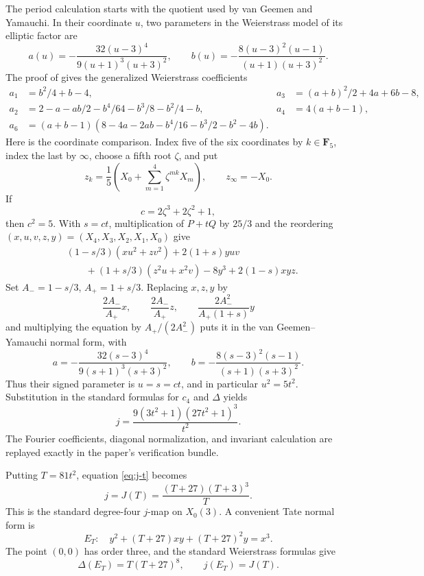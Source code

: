 \documentclass[11pt]{article}
\numberwithin{equation}{section}
\theoremstyle{definition}
\theoremstyle{remark}
\newcommand{\F}{\mathbf F}
\begin{document}
The period calculation starts with the quotient used by van Geemen and
Yamauchi.  In their coordinate \(u\), two parameters in the
Weierstrass model of its elliptic factor are
\[
 a(u)=-\frac{32(u-3)^4}{9(u+1)^3(u+3)^2},\qquad
 b(u)=-\frac{8(u-3)^2(u-1)}{(u+1)(u+3)^2}.
\]
The proof of \cite[Proposition~3.1]{VGY} gives the generalized Weierstrass
coefficients
\begin{align*}
 a_1&=b^2/4+b-4,&
 a_3&=(a+b)^2/2+4a+6b-8,\\
 a_2&=2-a-ab/2-b^4/64-b^3/8-b^2/4-b,&
 a_4&=4(a+b-1),\\
 a_6&=(a+b-1)(8-4a-2ab-b^4/16-b^3/2-b^2-4b).
\end{align*}
Here is the coordinate comparison.  Index five of the six coordinates by
\(k\in\F_5\), index the last by \(\infty\), choose a fifth root \(\zeta\), and
put
\[
 z_k=\frac{1}{5}\left(X_0+\sum_{m=1}^4\zeta^{mk}X_m\right),
 \qquad z_\infty=-X_0.
\]
If
\[
 c=2\zeta^3+2\zeta^2+1,
\]
then \(c^2=5\).  With \(s=ct\), multiplication of \(P+tQ\) by \(25/3\)
and the reordering
\((x,u,v,z,y)=(X_4,X_3,X_2,X_1,X_0)\) give
\begin{align*}
 &(1-s/3)(xu^2+zv^2)+2(1+s)yuv\\
 &\qquad +(1+s/3)(z^2u+x^2v)-8y^3+2(1-s)xyz.
\end{align*}
Set \(A_-=1-s/3\), \(A_+=1+s/3\).  Replacing \(x,z,y\) by
\[
 \frac{2A_-}{A_+}x,\qquad
 \frac{2A_-}{A_+}z,\qquad
 \frac{2A_-^2}{A_+(1+s)}y
\]
and multiplying the equation by \(A_+/(2A_-^2)\) puts it in the van
Geemen--Yamauchi normal form, with
\[
 a=-\frac{32(s-3)^4}{9(s+1)^3(s+3)^2},\qquad
 b=-\frac{8(s-3)^2(s-1)}{(s+1)(s+3)^2}.
\]
Thus their signed parameter is \(u=s=ct\), and in particular
\(u^2=5t^2\).  Substitution in the standard formulas for \(c_4\) and
\(\Delta\) yields
\begin{equation}\label{eq:j-t}
 j=\frac{9(3t^2+1)(27t^2+1)^3}{t^2}.
\end{equation}
The Fourier coefficients, diagonal normalization, and invariant calculation
are replayed exactly in the paper's verification bundle.

Putting \(T=81t^2\), equation \eqref{eq:j-t} becomes
\begin{equation}\label{eq:J}
 j=J(T)=\frac{(T+27)(T+3)^3}{T}.
\end{equation}
This is the standard degree-four \(j\)-map on \(X_0(3)\).  A convenient
Tate normal form is
\begin{equation}\label{eq:tate}
 E_T:\quad y^2+(T+27)xy+(T+27)^2y=x^3.
\end{equation}
The point \((0,0)\) has order three, and the standard Weierstrass formulas
give
\begin{equation}\label{eq:tate-invariants}
 \Delta(E_T)=T(T+27)^8,\qquad j(E_T)=J(T).
\end{equation}
\end{document}
